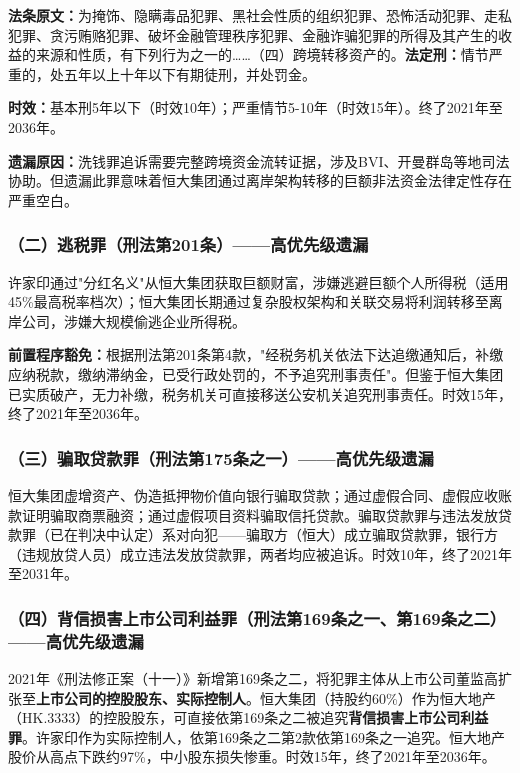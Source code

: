 \documentclass[11pt,a4paper,oneside,openany]{article}
\begin{document}
\textbf{法条原文：}为掩饰、隐瞒毒品犯罪、黑社会性质的组织犯罪、恐怖活动犯罪、走私犯罪、贪污贿赂犯罪、破坏金融管理秩序犯罪、金融诈骗犯罪的所得及其产生的收益的来源和性质，有下列行为之一的……（四）跨境转移资产的。\textbf{法定刑：}情节严重的，处五年以上十年以下有期徒刑，并处罚金。

\textbf{时效：}基本刑5年以下（时效10年）；严重情节5-10年（时效15年）。终了2021年至2036年。

\textbf{遗漏原因：}洗钱罪追诉需要完整跨境资金流转证据，涉及BVI、开曼群岛等地司法协助。但遗漏此罪意味着恒大集团通过离岸架构转移的巨额非法资金法律定性存在严重空白。

\subsubsection{（二）逃税罪（刑法第201条）——高优先级遗漏}
许家印通过"分红名义"从恒大集团获取巨额财富，涉嫌逃避巨额个人所得税（适用45\%最高税率档次）；恒大集团长期通过复杂股权架构和关联交易将利润转移至离岸公司，涉嫌大规模偷逃企业所得税。

\textbf{前置程序豁免：}根据刑法第201条第4款，"经税务机关依法下达追缴通知后，补缴应纳税款，缴纳滞纳金，已受行政处罚的，不予追究刑事责任"。但鉴于恒大集团已实质破产，无力补缴，税务机关可直接移送公安机关追究刑事责任。时效15年，终了2021年至2036年。

\subsubsection{（三）骗取贷款罪（刑法第175条之一）——高优先级遗漏}
恒大集团虚增资产、伪造抵押物价值向银行骗取贷款；通过虚假合同、虚假应收账款证明骗取商票融资；通过虚假项目资料骗取信托贷款。骗取贷款罪与违法发放贷款罪（已在判决中认定）系对向犯——骗取方（恒大）成立骗取贷款罪，银行方（违规放贷人员）成立违法发放贷款罪，两者均应被追诉。时效10年，终了2021年至2031年。

\subsubsection{（四）背信损害上市公司利益罪（刑法第169条之一、第169条之二）——高优先级遗漏}
2021年《刑法修正案（十一）》新增第169条之二，将犯罪主体从上市公司董监高扩张至\textbf{上市公司的控股股东、实际控制人}。恒大集团（持股约60\%）作为恒大地产（HK.3333）的控股股东，可直接依第169条之二被追究\textbf{背信损害上市公司利益罪}。许家印作为实际控制人，依第169条之二第2款依第169条之一追究。恒大地产股价从高点下跌约97\%，中小股东损失惨重。时效15年，终了2021年至2036年。
\end{document}
